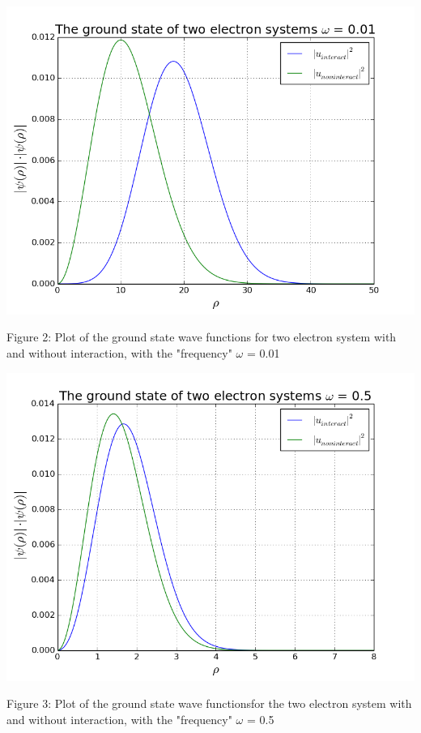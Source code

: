 \documentclass[norsk,a4paper,12pt]{article}
\begin{document}
\includegraphics[scale=0.5]{wavefunc_two_omega=0_01}\par
\vspace{1mm}
Figure 2: Plot of the ground state wave functions for two electron system with and without interaction, with the "frequency" $\omega$ = 0.01
\par
\vspace{7mm}

\includegraphics[scale=0.55]{wavefunc_two_omega=0_5}\par
\vspace{1mm}
Figure 3: Plot of the ground state wave functionsfor the two electron system with and without interaction, with the "frequency" $\omega$ = 0.5
\par
\vspace{7mm}
\end{document}
